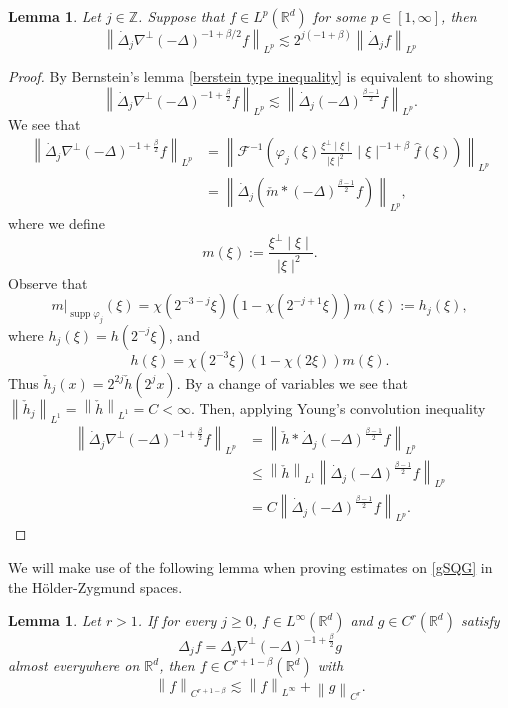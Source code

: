 \documentclass[12pt,xcolor=svgnames]{amsart}
\newtheorem{lemma}[theorem]{Lemma}
\newcommand{\R}{\mathbb{R}}
\newcommand{\abs}[1]{\mid\!#1\!\mid}
\newcommand{\norm}[2]{\left\lVert#1\right\rVert_{#2}}
\newcommand{\eqdef}{:=}
\DeclareMathOperator\supp{supp}
\begin{document}
\begin{lemma}
\label{Lemma A2}
Let $j \in \mathbb{Z}$. Suppose that $f \in L^p(\R^d)$ for some $p \in [1,\infty]$, then 
\begin{equation}
\label{berstein type inequality}
\norm{\dot{\Delta}_j \nabla^{\perp}(-\Delta)^{-1+\beta/2}f}{L^p} \lesssim 2^{j(-1+\beta)}\norm{\dot{\Delta}_jf}{L^p}
\end{equation}
\end{lemma}
\begin{proof} By Bernstein's lemma \eqref{berstein type inequality} is equivalent to showing 
$$
\norm{\dot{\Delta}_j\nabla^{\perp}(-\Delta)^{-1+\frac{\beta}{2}}f}{L^p} \lesssim \norm{\dot{\Delta}_j(-\Delta)^{\frac{\beta-1}{2}}f}{L^p}.
$$
We see that 
\begin{align*}
\norm{\dot{\Delta}_j\nabla^{\perp}(-\Delta)^{-1+\frac{\beta}{2}}f}{L^p} &= \norm{\mathcal{F}^{-1}\left(\varphi_j(\xi)\frac{\xi^{\perp}\abs{\xi}}{\abs{\xi}^2}\abs{\xi}^{-1+\beta}\hat{f}(\xi)\right)}{L^p}\\
&= \norm{\dot{\Delta}_j(\check{m}\ast (-\Delta)^{\frac{\beta-1}{2}}f)}{L^p},
\end{align*}
where we define
$$
m(\xi) \eqdef\frac{\xi^{\perp}\abs{\xi}}{\abs{\xi}^2}.
$$
Observe that
$$
m\vert_{\supp{\varphi_j}}(\xi) =\chi(2^{-3-j}\xi)(1-\chi(2^{-j+1}\xi))m(\xi)\eqdef h_j(\xi),
$$
where $h_j(\xi)=h(2^{-j}\xi)$, and 
$$
h(\xi) = \chi(2^{-3}\xi)(1-\chi(2\xi))m(\xi).
$$
Thus $\check{h}_j(x)=2^{2j}\check{h}(2^jx)$. By a change of variables we see that $\norm{\check{h}_j}{L^1}=\norm{\check{h}}{L^1}=C<\infty$. Then, applying Young's convolution inequality 
\begin{align*}
\norm{\dot{\Delta}_j\nabla^{\perp}(-\Delta)^{-1+\frac{\beta}{2}}f}{L^p} &= \norm{\check{h} \ast \dot{\Delta}_j (-\Delta)^{\frac{\beta-1}{2}}f}{L^p}\\
&\leq 
\norm{\check{h}}{L^1}\norm{\dot{\Delta}_j (-\Delta)^{\frac{\beta-1}{2}}f}{L^p}\\
&=C\norm{\dot{\Delta}_j (-\Delta)^{\frac{\beta-1}{2}}f}{L^p}.
\end{align*}
\end{proof}
We will make use of the following lemma when proving estimates on \eqref{gSQG} in the Hölder-Zygmund spaces.
\begin{lemma}
\label{Velocity Holder Estimate}
Let $r>1$. If for every $j\geq 0$, $f\in L^{\infty}(\R^d)$ and $g \in C^r(\R^d)$ satisfy
$$
\Delta_j f = \Delta_j\nabla^{\perp}(-\Delta)^{-1+\frac{\beta}{2}} g
$$
almost everywhere on $\R^d$, then $f \in C^{r+1-\beta}(\R^d)$ with
$$
\norm{f}{C^{r+1-\beta}} \lesssim \norm{f}{L^{\infty}}+\norm{g}{C^r}.
$$
\end{lemma}
\end{document}
